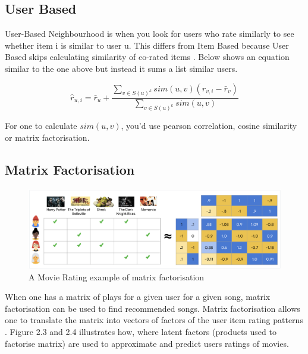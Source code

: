 \subsection{User Based}

User-Based Neighbourhood is when you look for users who rate similarly to see whether item i is similar to user u. This differs from Item Based because User Based skips calculating similarity of co-rated items \citep{pinela_recommender_2017}. Below shows an equation similar to the one above but instead it sums a list similar users.

\begin{equation}
	\hat{r} _{u,i} = \bar{r}_{u} + \frac{ \sum _{v \in S(u)^{k}} sim(u ,v) ( r_{v, i} - \bar{r}_{v})}{\sum _{v \in S(u)^{k}} sim(u , v)}
\end{equation}

For one to calculate $sim(u , v)$, you'd use pearson correlation, cosine similarity or matrix factorisation.

\subsection{Matrix Factorisation}

\begin{figure}[H]
	\includegraphics[scale=0.45]{images/matrix_factorisation_example}
	\centering
	\caption{A Movie Rating example of matrix factorisation  \citep{httpsdevelopersgooglecom_matrix_2023}} 
	\label{fig:figure}
\end{figure}

When one has a matrix of plays for a given user for a given song, matrix factorisation can be used to find recommended songs. Matrix factorisation allows one to translate the matrix into vectors of factors of the user item rating patterns \citep{koren_matrix_2009}. Figure 2.3 and 2.4 illustrates how, where latent factors (products used to factorise matrix) are used to approximate and predict users ratings of movies.

